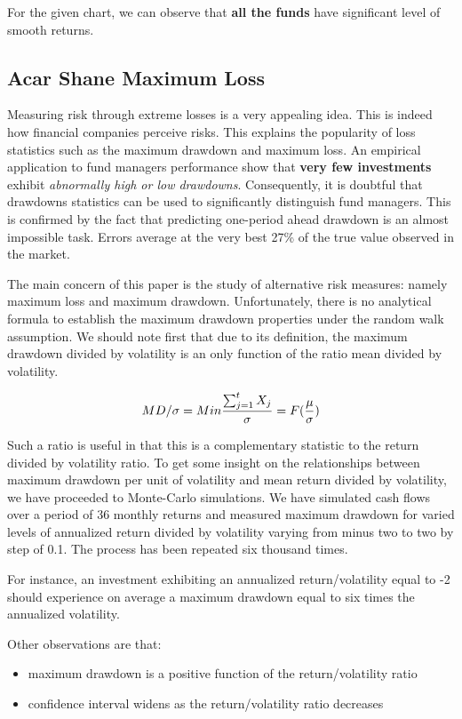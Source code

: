 \documentclass[12pt,letterpaper,english]{article}
\begin{document}
For the given chart, we can observe that \textbf{all the funds} have significant level of smooth returns.
\subsection{Acar Shane Maximum Loss}

Measuring risk through extreme losses is a very appealing idea. This is indeed how financial  companies perceive risks. This explains the popularity of loss statistics such as the maximum  drawdown and maximum loss. An empirical application to fund managers performance show that \textbf{very few investments} exhibit  \emph{abnormally high or low drawdowns}. Consequently, it is doubtful that drawdowns statistics can be used 
to significantly distinguish fund managers. This is confirmed by the fact that predicting one-period  ahead drawdown is an almost impossible task. Errors average at the very best 27\% of the true value  observed in the market.

The main concern of this paper is the study of alternative risk measures: namely maximum loss and  maximum drawdown. Unfortunately, there is no analytical formula to establish the maximum drawdown properties under the random walk assumption. We should note first that due to its definition, the maximum drawdown divided by volatility is an only function of the ratio mean divided by volatility.


\begin{equation}
MD / \sigma =  Min \frac{ \sum_{j=1}^{t} X_{j}}{\sigma} = F(\frac{\mu}{\sigma}) \\
\end{equation}

Such a ratio is useful in that this is a complementary statistic to the return divided by volatility ratio. To get some insight on the relationships between maximum drawdown per unit of volatility and mean  return divided by volatility, we have proceeded to Monte-Carlo simulations. We have simulated cash flows over a period of 36 monthly returns and measured maximum drawdown for varied levels of  annualized return divided by volatility varying from minus two to two by step of 0.1. The process has  been repeated six thousand times.

For instance, an investment exhibiting an annualized return/volatility equal to -2 
should experience on average a maximum drawdown equal to six times the annualized volatility. 

Other observations are that: 
\begin{itemize}
\item maximum drawdown is a positive function of the return/volatility ratio 
\item confidence interval widens as the return/volatility ratio decreases  
\end{itemize}
\end{document}
